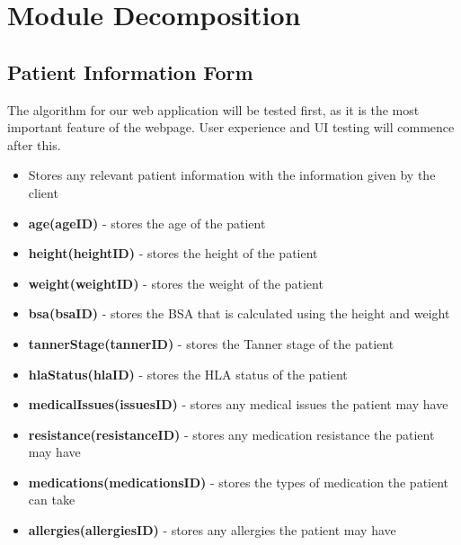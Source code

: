 \documentclass[12pt]{article}
\begin{document}
\section{Module Decomposition}

\subsection{Patient Information Form}
The algorithm for our web application will be tested first, as it is the most important feature of the webpage. User experience and UI testing will commence after this.
\begin{itemize}
\item Stores any relevant patient information with the information given by the client
\item \textbf{age(ageID)} - stores the age of the patient
\item \textbf{height(heightID)} - stores the height of the patient
\item \textbf{weight(weightID)} - stores the weight of the patient
\item \textbf{bsa(bsaID)} - stores the BSA that is calculated using the height and weight
\item \textbf{tannerStage(tannerID)} - stores the Tanner stage of the patient
\item \textbf{hlaStatus(hlaID)} - stores the HLA status of the patient
\item \textbf{medicalIssues(issuesID)} - stores any medical issues the patient may have
\item \textbf{resistance(resistanceID)} - stores any medication resistance the patient may have
\item \textbf{medications(medicationsID)} - stores the types of medication the patient can take
\item \textbf{allergies(allergiesID)} - stores any allergies the patient may have
\end{itemize}
\end{document}

